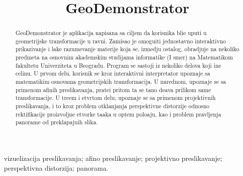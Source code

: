 \documentclass[cyr]{simposium}
\begin{document}
\begin{frontmatter}

\title{{\Lat GeoDemonstrator}}

\author{{ }}
\address{Matemati\ch ki fakultet, Univerzitet u Beogradu, Student{}ski trg 16, Beograd\\
}



\maketitle


\begin{abstract}
    {\Lat GeoDemonstrator} je aplikacija napisana sa ciljem da korisnika bli\zh e uputi u geometrijske transformacije u ravni. Zamisao je omogu\cc iti jednostavno interaktivno prikazivanje i lak\sh e razumevanje materije koja se, izmedju ostalog, obradjuje na nekoliko predmeta  na osnovnim akademskim studijama informatike (I smer) na Matemati\ch kom fakultetu Univerziteta u Beogradu. Program se sastoji iz nekoliko delova koji \ch ine celinu. U prvom delu, korisnik se kroz interaktivni interpretator upoznaje sa matemati\ch kim osnovama geometrijskih transformacija. U narednom, upoznaje se sa primenom afinih preslikavanja, prate\cc i pritom \sh ta se ta\ch no de\sh ava prilikom same transformacije. U tre\cc em i \ch etvrtom delu, upoznaje se sa primenom projektivnih preslikavanja, i to kroz problem otklanjanja perspektivne distorzije odnosno rektifikacije proizvoljne \ch etvorke ta\ch aka u op\sh tem polo\zh aju, kao i problem pravljenja panorame od preklapaju\cc ih slika.
\end{abstract}
\begin{keyword}
   vizuelizacija preslikavanja; afino preslikavanje; projektivno preslikavanje; perspektivna distorzija; panorama.
\end{keyword}
\end{frontmatter}
\end{document}
